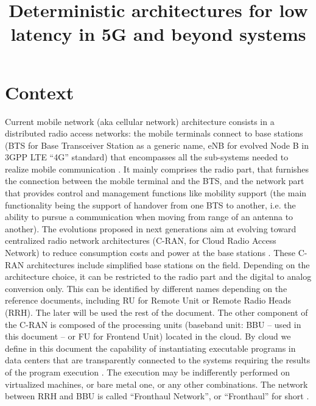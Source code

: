 \documentclass{article}
\begin{document}
\title{Deterministic architectures for low latency in 5G and beyond systems}


\maketitle

\section*{Context}

 Current mobile network (aka cellular network) architecture consists in a distributed radio access networks: the mobile terminals connect to base stations (BTS for Base Transceiver Station as a generic name, eNB for evolved Node B in 3GPP LTE “4G” standard) that encompasses all the sub-systems needed to realize mobile communication \cite{bouguen2012lte}. 
 It mainly comprises the radio part, that furnishes the connection between the mobile terminal and the BTS, and the network part that provides control and management functions like mobility support (the main functionality being the support of handover from one BTS to another, i.e. the ability to pursue a communication when moving from range of an antenna to another). The evolutions proposed in next generations aim at evolving toward centralized radio network architectures (C-RAN, for Cloud Radio Access Network) to reduce consumption costs and power at the base stations \cite{mobile2011c}. These C-RAN architectures include simplified base stations on the field. Depending on the architecture choice, it can be restricted to the radio part and the digital to analog conversion only. This can be identified by different names depending on the reference documents, including RU for Remote Unit or Remote Radio Heads (RRH). The later will be used the rest of the document. The other component of the C-RAN is composed of the processing units (baseband unit: BBU – used in this document – or FU for Frontend Unit) located in the cloud. By cloud we define in this document the capability of instantiating executable programs in data centers that are transparently connected to the systems  requiring the results of the program execution \cite{mobile2011c}. The execution may be indifferently performed on virtualized machines, or bare metal one, or any other combinations. The network between RRH and BBU is called “Fronthaul Network”, or ``Fronthaul'' for short \cite{ieeep802}.\\
\end{document}
